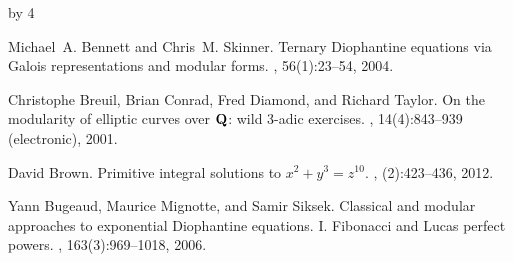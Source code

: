\documentclass[12pt]{scrartcl}
\def\anzspalten{4}
\newlength{\kastenwidth}
\newenvironment{kasten}{%
  \begin{lrbox}{\dummybox}%
    \begin{minipage}{0.96\linewidth}}%
    {\end{minipage}%
  \end{lrbox}%
  \raisebox{-\depth}{\psshadowbox[framesep=1em]{\usebox{\dummybox}}}\\[0.5em]}
\newenvironment{spalte}{%
  \setlength\kastenwidth{1.2\textwidth}
  \divide\kastenwidth by \anzspalten
  \begin{minipage}[t]{\kastenwidth}}{\end{minipage}\hfill}
\begin{document}
\begin{lrbox}{\spalten}
{\begin{spalte}
\begin{kasten}
         {\small

\begin{thebibliography}{10}


Michael~A. Bennett and Chris~M. Skinner.
\newblock Ternary {D}iophantine equations via {G}alois representations and
  modular forms.
, 56(1):23--54, 2004.

Christophe Breuil, Brian Conrad, Fred Diamond, and Richard Taylor.
\newblock On the modularity of elliptic curves over {$\bold Q$}: wild 3-adic
  exercises.
, 14(4):843--939 (electronic), 2001.

David Brown.
\newblock Primitive integral solutions to {$x^2+y^3=z^{10}$}.
, (2):423--436, 2012.


Yann Bugeaud, Maurice Mignotte, and Samir Siksek.
\newblock Classical and modular approaches to exponential {D}iophantine
  equations. {I}. {F}ibonacci and {L}ucas perfect powers.
, 163(3):969--1018, 2006.






\end{thebibliography}}
\end{kasten}
\end{spalte}}
\end{lrbox}
\end{document}
